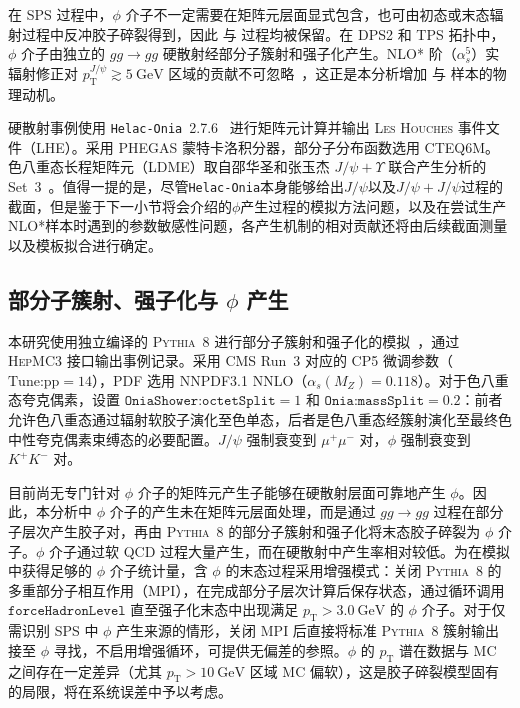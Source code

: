 在 SPS 过程中，$\phi$ 介子不一定需要在矩阵元层面显式包含，也可由初态或末态辐射过程中反冲胶子碎裂得到，因此 \SPSLO 与 \SPSNLO 过程均被保留。在 DPS2 和 TPS 拓扑中，$\phi$ 介子由独立的 $gg \to gg$ 硬散射经部分子簇射和强子化产生。NLO* 阶（$\alpha_s^5$）实辐射修正对 $p_{\mathrm T}^{J/\psi} \gtrsim \SI{5}{\giga\eV}$ 区域的贡献不可忽略~\cite{Lansberg:2014swa,Likhoded:2016}，这正是本分析增加 \SPSNLO 与 \DPStwoNLO 样本的物理动机。

硬散射事例使用 \texttt{Helac-Onia}~2.7.6~\cite{HS_SHAO_HO} 进行矩阵元计算并输出 \textsc{Les Houches} 事件文件（LHE）。采用 PHEGAS 蒙特卡洛积分器，部分子分布函数选用 CTEQ6M。色八重态长程矩阵元（LDME）取自邵华圣和张玉杰 $J/\psi+\Upsilon$ 联合产生分析的 Set~3~\cite{Shao:2016:JpsiUpsilon}。值得一提的是，尽管\texttt{Helac-Onia}本身能够给出$J/\psi$以及$J/\psi+J/\psi$过程的截面，但是鉴于下一小节将会介绍的$\phi$产生过程的模拟方法问题，以及在尝试生产NLO*样本时遇到的参数敏感性问题，各产生机制的相对贡献还将由后续截面测量以及模板拟合进行确定。

\subsection{部分子簇射、强子化与 \texorpdfstring{\(\phi\)}{phi} 产生}

本研究使用独立编译的 \textsc{Pythia}~8 进行部分子簇射和强子化的模拟~\cite{PYTHIA_8_2}，通过 \textsc{HepMC3} 接口输出事例记录。采用 CMS Run~3 对应的 CP5 微调参数（$\text{Tune:pp} = 14$），PDF 选用 NNPDF3.1 NNLO（$\alpha_{s}(M_{Z}) = 0.118$）。对于色八重态夸克偶素，设置 $\texttt{OniaShower:octetSplit} = 1$ 和 $\texttt{Onia:massSplit} = 0.2$：前者允许色八重态通过辐射软胶子演化至色单态，后者是色八重态经簇射演化至最终色中性夸克偶素束缚态的必要配置。$J/\psi$ 强制衰变到 $\mu^{+}\mu^{-}$ 对，$\phi$ 强制衰变到 $K^{+}K^{-}$ 对。

目前尚无专门针对 $\phi$ 介子的矩阵元产生子能够在硬散射层面可靠地产生 $\phi$。因此，本分析中 $\phi$ 介子的产生未在矩阵元层面处理，而是通过 $gg \to gg$ 过程在部分子层次产生胶子对，再由 \textsc{Pythia}~8 的部分子簇射和强子化将末态胶子碎裂为 $\phi$ 介子。$\phi$ 介子通过软 QCD 过程大量产生，而在硬散射中产生率相对较低。为在模拟中获得足够的 $\phi$ 介子统计量，含 $\phi$ 的末态过程采用增强模式：关闭 \textsc{Pythia}~8 的多重部分子相互作用（MPI），在完成部分子层次计算后保存状态，通过循环调用 $\texttt{forceHadronLevel}$ 直至强子化末态中出现满足 $p_{\mathrm{T}} > \SI{3.0}{\giga\eV}$ 的 $\phi$ 介子。对于仅需识别 SPS 中 $\phi$ 产生来源的情形，关闭 MPI 后直接将标准 \textsc{Pythia}~8 簇射输出接至 $\phi$ 寻找，不启用增强循环，可提供无偏差的参照。$\phi$ 的 $p_{\mathrm{T}}$ 谱在数据与 MC 之间存在一定差异（尤其 $p_{\mathrm{T}} > \SI{10}{\giga\eV}$ 区域 MC 偏软），这是胶子碎裂模型固有的局限，将在系统误差中予以考虑。

